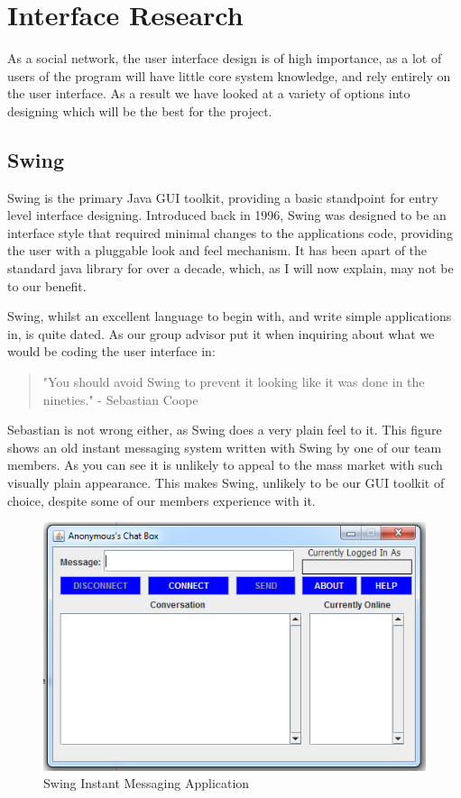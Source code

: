 \section{Interface Research}
As a social network, the user interface design is of high importance, as a lot 
of users of the program will have little core system knowledge, and rely 
entirely on the user interface. As a result we have looked at a variety of 
options into designing which will be the best for the project.

\subsection{Swing}
Swing is the primary Java GUI toolkit, providing a basic standpoint for entry 
level interface designing. Introduced back in 1996, Swing was designed to be 
an interface style that required minimal changes to the applications code, 
providing the user with a pluggable look and feel mechanism. It has been apart 
of the standard java library for over a decade, which, as I will now explain, 
may not be to our benefit.

Swing, whilst an excellent language to begin with, and write simple applications
in, is quite dated. As our group advisor put it when inquiring about what we 
would be coding the user interface in:

\begin{quote}
"You should avoid Swing to prevent it looking like it was done in the 
nineties." - Sebastian Coope
\end{quote}

Sebastian is not wrong either, as Swing does a very plain feel to it. This figure 
shows an old instant messaging system written with Swing by one of our team 
members. As you can see it is unlikely to appeal to the mass market with such 
visually plain appearance. This makes Swing, unlikely to be our GUI toolkit of 
choice, despite some of our members experience with it.

\begin{figure}[h]
    \centering
    \includegraphics[width=\textwidth]{images/design/swing.jpg}
    \caption{Swing Instant Messaging Application}
    \label{fig:swing_im}
\end{figure}

